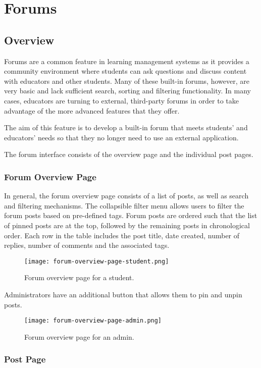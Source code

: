 \section{Forums}
\subsection{Overview}
Forums are a common feature in learning management systems as it provides a community environment where students can ask questions and discuss content with educators and other students.
Many of these built-in forums, however, are very basic and lack sufficient search, sorting and filtering functionality.
In many cases, educators are turning to external, third-party forums in order to take advantage of the more advanced features that they offer.

The aim of this feature is to develop a built-in forum that meets students' and educators' needs so that they no longer need to use an external application.

The forum interface consists of the overview page and the individual post pages.

\subsubsection{Forum Overview Page}

In general, the forum overview page consists of a list of posts, as well as search and filtering mechanisms.
The collapsible filter menu allows users to filter the forum posts based on pre-defined tags.
Forum posts are ordered such that the list of pinned posts are at the top, followed by the remaining posts in chronological order.
Each row in the table includes the post title, date created, number of replies, number of comments and the associated tags.

\begin{figure}[h!]
    \texttt{[image: forum-overview-page-student.png]}
    \centering
    \caption{Forum overview page for a student.}
\end{figure}

Administrators have an additional button that allows them to pin and unpin posts.

\begin{figure}[h!]
    \texttt{[image: forum-overview-page-admin.png]}
    \centering
    \caption{Forum overview page for an admin.}
\end{figure}

\subsubsection{Post Page}

